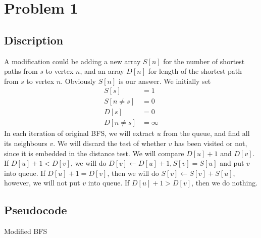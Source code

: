 \documentclass{report}
\begin{document}
    \section*{Problem 1}
    \subsection*{Discription}
    A modification could be adding a new array $S[n]$ for the number of shortest paths 
    from $s$ to vertex $n$, and an array $D[n]$ for length of the shortest path from 
    $s$ to vertex $n$. Obviously $S[n]$ is our answer. We initially set 
    \begin{align*}
        S[s] &= 1 \\
        S[n \neq s] &= 0 \\
        D[s] &= 0 \\
        D[n \neq s] &= \infty
    \end{align*}
    In each iteration of original BFS, we will extract $u$ from the queue, and find
    all its neighbours $v$. We will discard the test of whether $v$ has been visited
    or not, since it is embedded in the distance test.
    We will compare $D[u]+1$ and $D[v]$. If $D[u] + 1 < D[v]$, we will do 
    $D[v] \gets D[u] + 1, S[v] = S[u]$ and put $v$ into queue. 
    If $D[u]+1 = D[v]$, then we will do $S[v] \gets S[v] + S[u]$, however,
    we will not put $v$ into queue. If $D[u] + 1 > D[v]$, then we do nothing.

    \subsection*{Pseudocode}
    \begin{algorithm}
        \caption{Modified BFS}
        \begin{algorithmic}[1]
                     
                     
                    \EndIf{}
                \EndFor{}
            \EndWhile{}
        \end{algorithmic}
    \end{algorithm}
\end{document}
